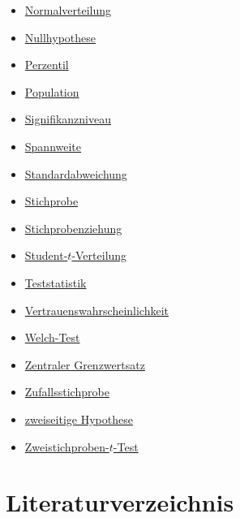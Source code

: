 \documentclass[
]{book}
\theoremstyle{definition}
\theoremstyle{definition}
\theoremstyle{definition}
\theoremstyle{definition}
\theoremstyle{remark}
\begin{document}
\begin{itemize}
\item
  \hyperref[customdef-normalverteilung]{Normalverteilung}
\item
  \hyperref[customdef-nullhypothese]{Nullhypothese}
\item
  \hyperref[customdef-perzentil]{Perzentil}
\item
  \hyperref[customdef-population]{Population}
\item
  \hyperref[customdef-signifikanzniveau]{Signifikanzniveau}
\item
  \hyperref[customdef-spannweite]{Spannweite}
\item
  \hyperref[customdef-std]{Standardabweichung}
\item
  \hyperref[customdef-stichprobe]{Stichprobe}
\item
  \hyperref[customdef-stichprobenziehung]{Stichprobenziehung}
\item
  \hyperref[customdef-student-verteilung]{Student-\(t\)-Verteilung}
\item
  \hyperref[customdef-teststatistik]{Teststatistik}
\item
  \hyperref[customdef-confidence-level]{Vertrauenswahrscheinlichkeit}
\item
  \hyperref[customdef-welch-test]{Welch-Test}
\item
  \hyperref[customdef-zentraler-grenzwertsatz]{Zentraler Grenzwertsatz}
\item
  \hyperref[customdef-zufallsstichprobe]{Zufallsstichprobe}
\item
  \hyperref[customdef-zweiseitige-hypothese]{zweiseitige Hypothese}
\item
  \hyperref[customdef-twosample-t-test]{Zweistichproben-\(t\)-Test}
\end{itemize}

\chapter*{Literaturverzeichnis}\label{literaturverzeichnis}

  
\end{document}
